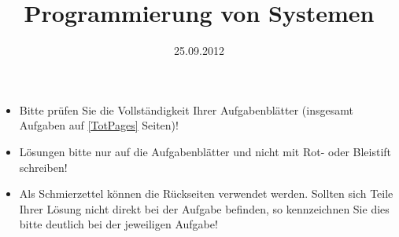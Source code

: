 \documentclass{uulm-exam}
\begin{document}
\title{Programmierung von Systemen}
\date{25.09.2012}

\begin{hints}
\begin{itemize}
\item Bitte prüfen Sie die Vollständigkeit Ihrer Aufgabenblätter
(insgesamt \gettotalassignments{} Aufgaben auf  \ref{TotPages} Seiten)!
\item Lösungen bitte nur auf die Aufgabenblätter und nicht mit Rot- oder
Bleistift schreiben!
\item Als Schmierzettel können die Rückseiten verwendet werden.
Sollten sich Teile Ihrer Lösung nicht direkt bei der Aufgabe befinden, so
kennzeichnen Sie dies bitte deutlich bei der jeweiligen Aufgabe!
\end{itemize}
\end{hints}

\maketitle

\graphicspath{{aufgaben/img/}}

\begin{assignments}

\end{assignments}


% 
\end{document}
